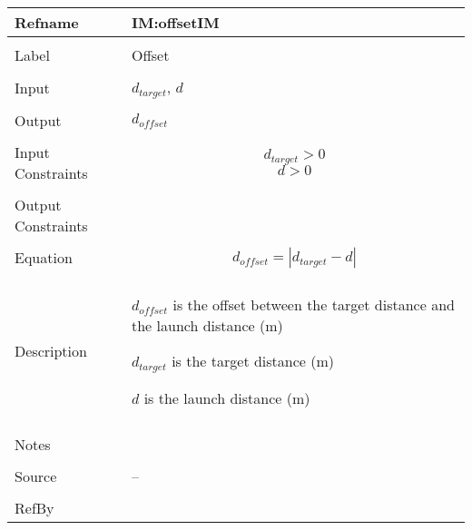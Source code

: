 \documentclass[12pt]{article}
\begin{document}
\noindent \begin{minipage}{\textwidth}
\begin{tabular}{p{} p{}}
\toprule \textbf{Refname} & \textbf{IM:offsetIM}
\label{IM:offsetIM}
\\ \midrule \\
Label & Offset
\\ \midrule \\
Input & ${d_{target}}$, $d$
\\ \midrule \\
Output & ${d_{offset}}$
\\ \midrule \\
Input Constraints & \begin{displaymath}
                    {d_{target}}>0
                    \end{displaymath}
                    \begin{displaymath}
                    d>0
                    \end{displaymath}
\\ \midrule \\
Output Constraints & 
\\ \midrule \\
Equation & \begin{displaymath}
           {d_{offset}}=|{d_{target}}-d|
           \end{displaymath}
\\ \midrule \\
Description & \begin{symbDescription}
              \item{${d_{offset}}$ is the offset between the target distance and the launch distance (m)}
              \item{${d_{target}}$ is the target distance (m)}
              \item{$d$ is the launch distance (m)}
              \end{symbDescription}
\\ \midrule \\
Notes & 
\\ \midrule \\
Source & --
\\ \midrule \\
RefBy & 
\\ \bottomrule \end{tabular}
\end{minipage}
\par~
\end{document}
